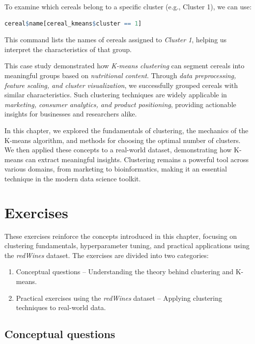 \documentclass[
  11pt,
]{book}
\providecommand{\tightlist}{%
  \setlength{\itemsep}{0pt}\setlength{\parskip}{0pt}}
\theoremstyle{definition}
\theoremstyle{definition}
\theoremstyle{definition}
\theoremstyle{definition}
\theoremstyle{remark}
\begin{document}
To examine which cereals belong to a specific cluster (e.g., Cluster 1), we can use:

\begin{lstlisting}[language=R]
cereal$name[cereal_kmeans$cluster == 1]
\end{lstlisting}

This command lists the names of cereals assigned to \emph{Cluster 1}, helping us interpret the characteristics of that group.

This case study demonstrated how \emph{K-means clustering} can segment cereals into meaningful groups based on \emph{nutritional content}. Through \emph{data preprocessing, feature scaling, and cluster visualization}, we successfully grouped cereals with similar characteristics. Such clustering techniques are widely applicable in \emph{marketing, consumer analytics, and product positioning}, providing actionable insights for businesses and researchers alike.

In this chapter, we explored the fundamentals of clustering, the mechanics of the K-means algorithm, and methods for choosing the optimal number of clusters. We then applied these concepts to a real-world dataset, demonstrating how K-means can extract meaningful insights. Clustering remains a powerful tool across various domains, from marketing to bioinformatics, making it an essential technique in the modern data science toolkit.

\section*{Exercises}\label{exercises-9}


These exercises reinforce the concepts introduced in this chapter, focusing on clustering fundamentals, hyperparameter tuning, and practical applications using the \emph{redWines} dataset. The exercises are divided into two categories:

\begin{enumerate}
\def\labelenumi{\arabic{enumi}.}
\tightlist
\item
  Conceptual questions -- Understanding the theory behind clustering and K-means.\\
\item
  Practical exercises using the \emph{redWines} dataset -- Applying clustering techniques to real-world data.
\end{enumerate}

\subsection*{Conceptual questions}\label{conceptual-questions-11}
\end{document}
